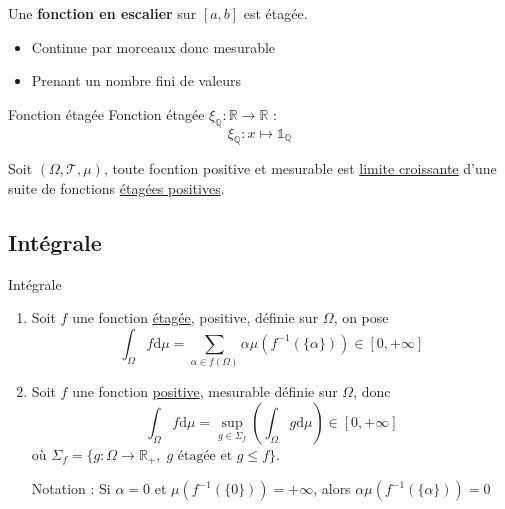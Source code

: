 \begin{Prop}{}{}
  Une \textbf{fonction en escalier} sur $[a,b]$ est étagée.
\end{Prop}

\begin{myproof}{}{}
\begin{itemize}

    \item Continue par morceaux donc mesurable 
    \item Prenant un nombre fini de valeurs

\end{itemize}
\end{myproof}

\begin{Example}{Fonction étagée}{}
  Fonction étagée $\xi_ \mathbb{Q} : \mathbb{R} \to \mathbb{R}$ :
\begin{equation}
  \xi _{\mathbb{Q}} : x \mapsto \mathbb{1} _{\mathbb{Q}}
\end{equation}
\end{Example}

\begin{Prop}{}{}
Soit $(\Omega, \mathcal{T}, \mu)$, toute focntion positive et mesurable est \underline{limite croissante} d'une suite de fonctions \underline{étagées positives}.
\end{Prop}

\subsection{Intégrale} %
\label{sub:Intégrale}

\begin{Definition}[colbacktitle=red!75!black]{Intégrale}{}
\begin{enumerate}

    \item Soit $f$ une fonction \underline{étagée}, positive, définie sur $\Omega$, on pose 
      \begin{equation}
        \int_{\Omega}^{} f \mathrm{d} \mu = \sum_{\alpha \in f(\Omega)}^{} \alpha \mu (f ^{-1} ( \{\alpha\})) \in [0, + \infty]
      \end{equation}

    \item Soit $f$ une fonction \underline{positive}, mesurable définie sur $\Omega$, donc 
      \begin{equation}
        \int_{\Omega}^{} f \mathrm{d} \mu = \underset{g \in \Sigma_f}{\sup} \left( \int_{\Omega}^{} g \mathrm{d} \mu\right) \in [0, + \infty]
      \end{equation}
      où $\Sigma _f = \{g : \Omega \to \mathbb{R}_ + , \; g \text{ étagée et } g \le f \}$. 

      Notation : Si $\alpha = 0$ et $\mu(f ^{-1}(\{0\})) = + \infty$, alors $\alpha \mu( f ^{-1} (\{\alpha\})) = 0$

\end{enumerate}
\end{Definition}


